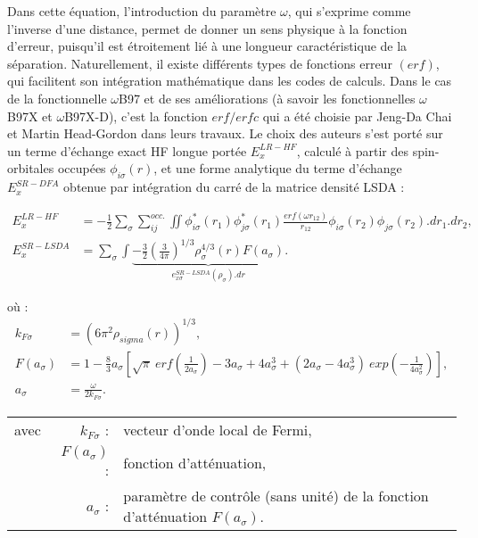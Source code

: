 \documentclass[12pt,a4paper]{book}
\begin{document}
	Dans cette équation, l'introduction du paramètre $\omega$, qui s'exprime comme l'inverse d'une distance, permet de donner un sens physique à la fonction d'erreur, puisqu'il est étroitement lié à une longueur caractéristique de la séparation.
	Naturellement, il existe différents types de fonctions erreur $(erf)$, qui facilitent son intégration mathématique dans les codes de calculs. Dans le cas de la fonctionnelle $\omega$B97 \cite{chai2008long} et de ses améliorations (à savoir les fonctionnelles $\omega$B97X et $\omega$B97X-D), c'est la fonction $erf/erfc$ qui a été choisie par Jeng-Da Chai et Martin Head-Gordon dans leurs travaux. 
	Le choix des auteurs s'est porté sur un terme d'échange exact HF longue portée $E_{x}^{LR-HF}$, calculé à partir des spin-orbitales occupées $\phi_{i \sigma}(r)$, et une forme analytique du terme d'échange $E_{x}^{SR-DFA}$ obtenue par intégration du carré de la matrice densité LSDA :
	
	\begin{align}
	E_{x}^{LR-HF} &= -\frac{1}{2} \sum_{\sigma} \sum_{ij}^{occ.} \iint \phi_{i \sigma}^{*}(r_{1}) \phi_{j \sigma}^{*}(r_{1}) \frac{erf(\omega r_{12})}{r_{12}} \phi_{i \sigma}(r_{2}) \phi_{j \sigma}(r_{2}).dr_{1}.dr_{2}, \\
	E_{x}^{SR-LSDA} &= \sum_{\sigma} \int \underbrace{-\frac{3}{2}\left(\frac{3}{4\pi}\right)^{1/3}\rho_{\sigma}^{4/3} (r) F(a_{\sigma})}_{e_{x \sigma}^{SR-LSDA} (\rho_{\sigma}) .dr}.
	\end{align}
	
	\noindent où :
	\begin{align}
	k_{F \sigma}&=(6\pi^{2}\rho_{sigma}(r))^{1/3},\nonumber\\
	F(a_{\sigma})&=1-\frac{8}{3}a_{\sigma}\left[\sqrt{\pi}\: erf\left(\frac{1}{2a_{\sigma}}\right)-3a_{\sigma}+4a_{\sigma}^{3}+(2a_{\sigma}-4a_{\sigma}^{3}) \: exp\left(-\frac{1}{4a_{\sigma}^{2}}\right)\right],\nonumber\\
	a_{\sigma}&=\frac{\omega}{2k_{F\sigma}}.\nonumber
	\end{align}
	
	\begin{flushleft}
		\begin{tabular}{@{}lrp{10cm}}
			avec & $k_{F\sigma}$ : & vecteur d'onde local de Fermi,\\
			& $F(a_{\sigma})$ : & fonction d'atténuation,\\
			& $a_{\sigma}$ : & paramètre de contrôle (sans unité) de la fonction d'atténuation $F(a_{\sigma})$.
		\end{tabular}
	\end{flushleft}
	
\end{document}
